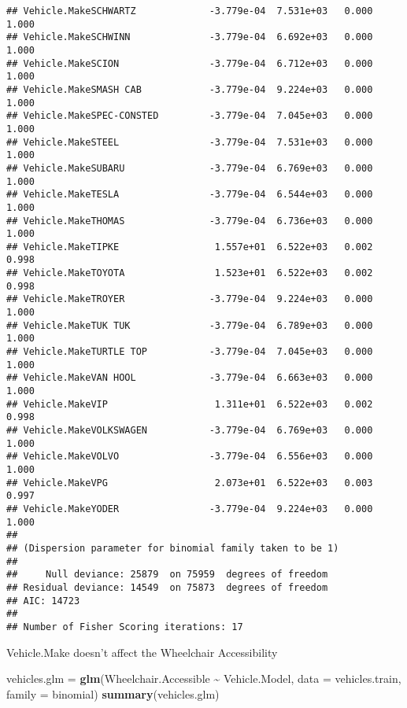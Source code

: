 \documentclass[
]{article}
\newenvironment{Shaded}{\begin{snugshade}}{\end{snugshade}}
\newcommand{\AttributeTok}[1]{\textcolor[rgb]{0.13,0.29,0.53}{#1}}
\newcommand{\FunctionTok}[1]{\textcolor[rgb]{0.13,0.29,0.53}{\textbf{#1}}}
\newcommand{\NormalTok}[1]{#1}
\newcommand{\OtherTok}[1]{\textcolor[rgb]{0.56,0.35,0.01}{#1}}
\newcommand{\SpecialCharTok}[1]{\textcolor[rgb]{0.81,0.36,0.00}{\textbf{#1}}}
\begin{document}
\begin{verbatim}
## Vehicle.MakeSCHWARTZ             -3.779e-04  7.531e+03   0.000    1.000
## Vehicle.MakeSCHWINN              -3.779e-04  6.692e+03   0.000    1.000
## Vehicle.MakeSCION                -3.779e-04  6.712e+03   0.000    1.000
## Vehicle.MakeSMASH CAB            -3.779e-04  9.224e+03   0.000    1.000
## Vehicle.MakeSPEC-CONSTED         -3.779e-04  7.045e+03   0.000    1.000
## Vehicle.MakeSTEEL                -3.779e-04  7.531e+03   0.000    1.000
## Vehicle.MakeSUBARU               -3.779e-04  6.769e+03   0.000    1.000
## Vehicle.MakeTESLA                -3.779e-04  6.544e+03   0.000    1.000
## Vehicle.MakeTHOMAS               -3.779e-04  6.736e+03   0.000    1.000
## Vehicle.MakeTIPKE                 1.557e+01  6.522e+03   0.002    0.998
## Vehicle.MakeTOYOTA                1.523e+01  6.522e+03   0.002    0.998
## Vehicle.MakeTROYER               -3.779e-04  9.224e+03   0.000    1.000
## Vehicle.MakeTUK TUK              -3.779e-04  6.789e+03   0.000    1.000
## Vehicle.MakeTURTLE TOP           -3.779e-04  7.045e+03   0.000    1.000
## Vehicle.MakeVAN HOOL             -3.779e-04  6.663e+03   0.000    1.000
## Vehicle.MakeVIP                   1.311e+01  6.522e+03   0.002    0.998
## Vehicle.MakeVOLKSWAGEN           -3.779e-04  6.769e+03   0.000    1.000
## Vehicle.MakeVOLVO                -3.779e-04  6.556e+03   0.000    1.000
## Vehicle.MakeVPG                   2.073e+01  6.522e+03   0.003    0.997
## Vehicle.MakeYODER                -3.779e-04  9.224e+03   0.000    1.000
## 
## (Dispersion parameter for binomial family taken to be 1)
## 
##     Null deviance: 25879  on 75959  degrees of freedom
## Residual deviance: 14549  on 75873  degrees of freedom
## AIC: 14723
## 
## Number of Fisher Scoring iterations: 17
\end{verbatim}

Vehicle.Make doesn't affect the Wheelchair Accessibility

\begin{Shaded}
\begin{Highlighting}[]
\NormalTok{vehicles.glm }\OtherTok{=} \FunctionTok{glm}\NormalTok{(Wheelchair.Accessible }\SpecialCharTok{\textasciitilde{}}\NormalTok{ Vehicle.Model, }\AttributeTok{data =}\NormalTok{ vehicles.train, }
                   \AttributeTok{family =}\NormalTok{ binomial)}
\FunctionTok{summary}\NormalTok{(vehicles.glm)}
\end{Highlighting}
\end{Shaded}
\end{document}

